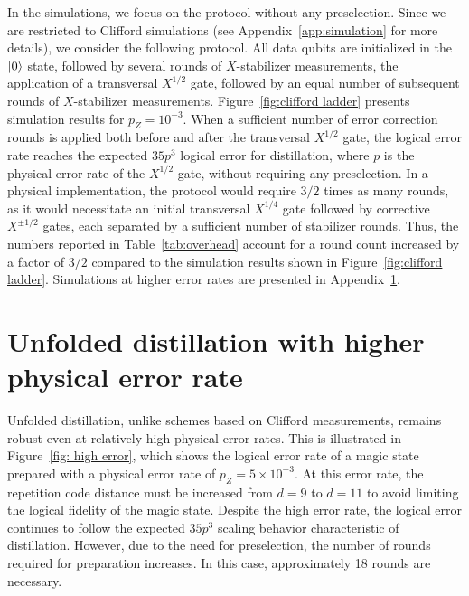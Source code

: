 \documentclass[%
 reprint,
superscriptaddress,
 amsmath,amssymb,
 aps,
]{revtex4-2}
\begin{document}
In the simulations, we focus on the protocol without any preselection. Since we are restricted to Clifford simulations (see Appendix~\ref{app:simulation} for more details), we consider the following protocol. All data qubits are initialized in the $\ket{0}$ state, followed by several rounds of $X$-stabilizer measurements, the application of a transversal $X^{1/2}$ gate, followed by an equal number of subsequent rounds of $X$-stabilizer measurements. Figure~\ref{fig:clifford ladder} presents simulation results for $p_Z=10^{-3}$. When a sufficient number of error correction rounds is applied both before and after the transversal $X^{1/2}$ gate, the logical error rate reaches the expected $35p^3$ logical error for distillation, where $p$ is the physical error rate of the $X^{1/2}$ gate, without requiring any preselection. In a physical implementation, the protocol would require $3/2$ times as many rounds, as it would necessitate an initial transversal $X^{1/4}$ gate followed by corrective $X^{\pm 1/2}$ gates, each separated by a sufficient number of stabilizer rounds. Thus, the numbers reported in Table~\ref{tab:overhead} account for a round count increased by a factor of $3/2$ compared to the simulation results shown in Figure~\ref{fig:clifford ladder}. Simulations at higher error rates are presented in Appendix~\ref{app:high error}.

\section{Unfolded distillation with higher physical error rate}
\label{app:high error}

Unfolded distillation, unlike schemes based on Clifford measurements, remains robust even at relatively high physical error rates. This is illustrated in Figure~\ref{fig: high error}, which shows the logical error rate of a magic state prepared with a physical error rate of $p_Z = 5 \times 10^{-3}$. At this error rate, the repetition code distance must be increased from $d=9$ to $d=11$ to avoid limiting the logical fidelity of the magic state. Despite the high error rate, the logical error continues to follow the expected $35p^3$ scaling behavior characteristic of distillation. However, due to the need for preselection, the number of rounds required for preparation increases. In this case, approximately 18 rounds are necessary.
\end{document}
